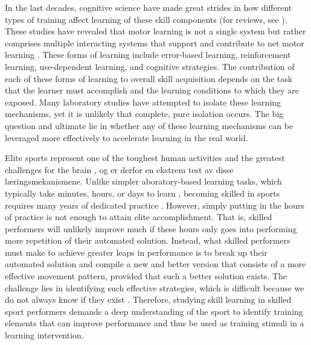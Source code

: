 In the last decades, cognitive science have made great strides in how different types of training affect learning of these skill components (for reviews, see \cite{krakauer_motor_2019, spampinato_multiple_2021}). These studies have revealed that motor learning is not a single system but rather comprises multiple interacting systems that support and contribute to net motor learning \cite{haith_model-based_2013, uehara_learning_2018, doya_complementary_2000, spampinato_multiple_2021,makino_circuit_2016, huang_rethinking_2011, wolpert_principles_2011, wolpert_motor_2010}. These forms of learning include error-based learning, reinforcement learning, use-dependent learning, and cognitive strategies\cite{spampinato_multiple_2021}. The contribution of each of these forms of learning to overall skill acquisition depends on the task that the learner must accomplish and the learning conditions to which they are exposed. Many laboratory studies have attempted to isolate these learning mechanisms, yet it is unlikely that complete, pure isolation occurs\cite{spampinato_multiple_2021}. The big question and ultimate lie in whether any of these learning mechanisms can be leveraged more effectively to accelerate learning in the real world.

Elite sports represent one of the toughest human activities and the greatest challenges for the brain \cite{walsh_is_2014}, og er derfor en ekstrem test av disse læringsmekanismene. Unlike simpler aboratory-based learning tasks, which typically take minutes, hours, or days to learn \cite{du_relationship_2022, yarrow_inside_2009}, becoming skilled in sports requires many years of dedicated practice \cite{hodges_predicting_2004, vaeyens_talent_2009}.  However, simply putting in the hours of practice is not enough to attain elite accomplishment. That is, skilled performers will unlikely improve much if these hours only goes into performing more repetition of their automated solution\cite{ericsson_development_2003, ericsson_role_1993, ericsson_scientific_1998, ericsson_expert_1994, du_relationship_2022}. Instead, what skilled performers must make to achieve greater leaps in performance is to break up their automated solution and compile a new and better version that consists of a more effective movement pattern, provided that such a better solution exists\cite{du_relationship_2022}. The challenge lies in identifying such effective strategies, which is difficult because we do not always know if they exist \cite{gray_plateaus_2017, cohen_effect_2021}. Therefore, studying skill learning in skilled sport performers demands a deep understanding of the sport to identify training elements that can improve performance and thus be used as training stimuli in a learning intervention. 

